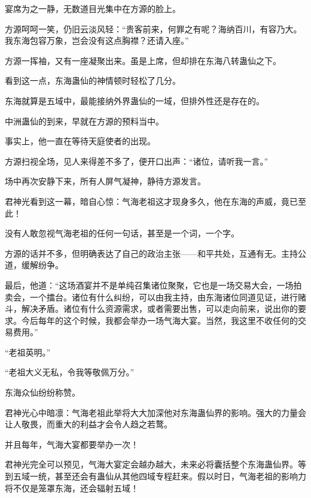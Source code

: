 \begin{this_body}
宴席为之一静，无数道目光集中在方源的脸上。

方源呵呵一笑，仍旧云淡风轻：“贵客前来，何罪之有呢？海纳百川，有容乃大。我东海包容万象，岂会没有这点胸襟？还请入座。”

方源一挥袖，又有一座凝聚出来。虽是上席，但却排在东海八转蛊仙之下。

看到这一点，东海蛊仙的神情顿时轻松了几分。

东海就算是五域中，最能接纳外界蛊仙的一域，但排外性还是存在的。

中洲蛊仙的到来，早就在方源的预料当中。

事实上，他一直在等待天庭使者的出现。

方源扫视全场，见人来得差不多了，便开口出声：“诸位，请听我一言。”

场中再次安静下来，所有人屏气凝神，静待方源发言。

君神光看到这一幕，暗自心惊：气海老祖这才现身多久，他在东海的声威，竟已至此！

没有人敢忽视气海老祖的任何一句话，甚至是一个词，一个字。

方源的话并不多，但明确表达了自己的政治主张——和平共处，互通有无。主持公道，缓解纷争。

最后，他道：“这场酒宴并不是单纯召集诸位聚聚，它也是一场交易大会，一场拍卖会，一个擂台。诸位有什么纠纷，可以由我主持，由东海诸位同道见证，进行赌斗，解决矛盾。诸位有什么资源需求，或者需要出售，可以走向前来，说出你的要求。今后每年的这个时候，我都会举办一场气海大宴。当然，我这里不收任何的交易费用。”

“老祖英明。”

“老祖大义无私，令我等敬佩万分。”

东海众仙纷纷称赞。

君神光心中暗凛：气海老祖此举将大大加深他对东海蛊仙界的影响。强大的力量会让人敬畏，而重大的利益才会令人趋之若鹜。

并且每年，气海大宴都要举办一次！

君神光完全可以预见，气海大宴定会越办越大，未来必将囊括整个东海蛊仙界。等到五域一统，甚至还会有蛊仙从其他四域专程赶来。假以时日，气海老祖的影响力将不仅是笼罩东海，还会辐射五域！

\end{this_body}

